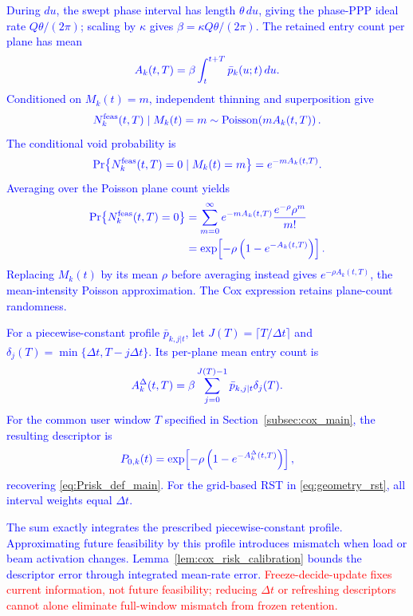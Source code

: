 \documentclass[10pt,letterpaper,journal]{IEEEtran}
\newcommand{\revnew}[1]{\textcolor{red}{#1}}
\begin{document}
\textcolor{blue}{During $du$, the swept phase interval has length $\theta\,du$, giving the phase-PPP ideal rate $Q\theta/(2\pi)$; scaling by $\kappa$ gives $\beta=\kappa Q\theta/(2\pi)$. The retained entry count per plane has mean}
\[
\textcolor{blue}{A_k(t,T)=\beta\int_t^{t+T}\bar p_k(u;t)\,du.}
\]
\textcolor{blue}{Conditioned on $M_k(t)=m$, independent thinning and superposition give}
\[
\textcolor{blue}{
N_k^{\rm feas}(t,T)\mid M_k(t)=m
\sim\operatorname{Poisson}\!\left(mA_k(t,T)\right).
}
\label{eq:poisson_count_app}
\]
\textcolor{blue}{The conditional void probability is}
\[
\textcolor{blue}{
\Pr\!\left\{N_k^{\rm feas}(t,T)=0\mid M_k(t)=m\right\}
=e^{-mA_k(t,T)}.
}
\label{eq:void_cont_app}
\]
\textcolor{blue}{Averaging over the Poisson plane count yields}
\[
\textcolor{blue}{
\begin{aligned}
\Pr\!\left\{N_k^{\rm feas}(t,T)=0\right\}
&=\sum_{m=0}^{\infty}e^{-mA_k(t,T)}\frac{e^{-\rho}\rho^m}{m!}\\
&=\exp\!\left[-\rho\left(1-e^{-A_k(t,T)}\right)\right].
\end{aligned}
}
\label{eq:cox_risk_cont_app}
\]
\textcolor{blue}{Replacing $M_k(t)$ by its mean $\rho$ before averaging instead gives $e^{-\rho A_k(t,T)}$, the mean-intensity Poisson approximation. The Cox expression retains plane-count randomness.}

\textcolor{blue}{For a piecewise-constant profile $\bar p_{k,j|t}$, let $J(T)=\lceil T/\Delta t\rceil$ and $\delta_j(T)=\min\{\Delta t,T-j\Delta t\}$.
Its per-plane mean entry count is}
\[
\textcolor{blue}{A_k^\Delta(t,T)=\beta\sum_{j=0}^{J(T)-1}\bar p_{k,j|t}\delta_j(T).}
\]
\textcolor{blue}{For the common user window $T$ specified in Section~\ref{subsec:cox_main}, the resulting descriptor is}
\[
\textcolor{blue}{
P_{0,k}(t)
=\exp\!\left[-\rho\left(1-e^{-A_k^\Delta(t,T)}\right)\right],
}
\label{eq:cox_risk_discrete_app}
\]
\textcolor{blue}{recovering \eqref{eq:Prisk_def_main}. For the grid-based RST in \eqref{eq:geometry_rst}, all interval weights equal $\Delta t$.}

\textcolor{blue}{
The sum exactly integrates the prescribed piecewise-constant profile. Approximating future feasibility by this profile introduces mismatch when load or beam activation changes. Lemma~\ref{lem:cox_risk_calibration} bounds the descriptor error through integrated mean-rate error.
}
\revnew{Freeze-decide-update fixes current information, not future feasibility; reducing $\Delta t$ or refreshing descriptors cannot alone eliminate full-window mismatch from frozen retention.}
\end{document}

